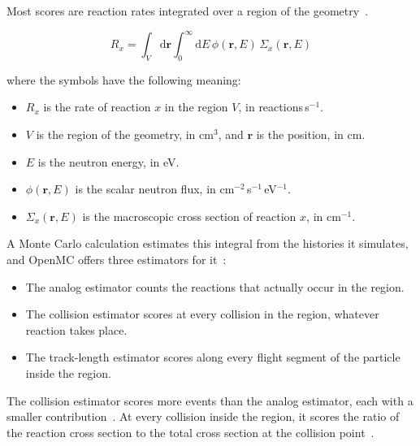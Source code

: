 Most scores are reaction rates integrated over a region of the
geometry~\cite{lux_koblinger_1991}.

\begin{equation}
R_x = \int_V \mathrm{d}\mathbf{r} \int_0^\infty \mathrm{d}E\,
\phi(\mathbf{r},E)\,\Sigma_x(\mathbf{r},E)
\label{eq:mc-rr}
\end{equation}

\noindent where the symbols have the following meaning:

\begin{itemize}
  \item $R_x$ is the rate of reaction $x$ in the region $V$, in
        reactions\,s$^{-1}$.

  \item $V$ is the region of the geometry, in cm$^{3}$, and
        $\mathbf{r}$ is the position, in cm.

  \item $E$ is the neutron energy, in eV.

  \item $\phi(\mathbf{r},E)$ is the scalar neutron flux, in
        cm$^{-2}$\,s$^{-1}$\,eV$^{-1}$.

  \item $\Sigma_x(\mathbf{r},E)$ is the macroscopic cross section of
        reaction $x$, in cm$^{-1}$.
\end{itemize}

A Monte Carlo calculation estimates this integral from the histories it
simulates, and OpenMC offers three estimators for it~\cite{openmc_docs}:

\begin{itemize}
  \item The analog estimator counts the reactions that actually occur
        in the region.

  \item The collision estimator scores at every collision in the
        region, whatever reaction takes place.

  \item The track-length estimator scores along every flight segment
        of the particle inside the region.
\end{itemize}

The collision estimator scores more events than the analog estimator,
each with a smaller contribution~\cite{openmc_docs}. At every collision
inside the region, it scores the ratio of the reaction cross section to
the total cross section at the collision point~\cite{lux_koblinger_1991}.


